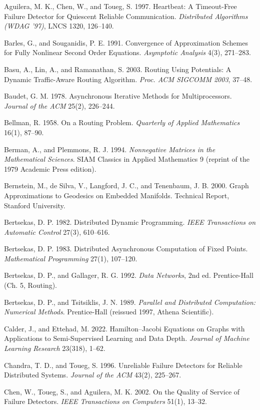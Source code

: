 \documentclass[11pt]{article}
\theoremstyle{plain}
\numberwithin{equation}{section}
\begin{document}
Aguilera, M. K., Chen, W., and Toueg, S. 1997. Heartbeat: A Timeout-Free Failure Detector for Quiescent Reliable Communication. \emph{Distributed Algorithms (WDAG '97)}, LNCS 1320, 126–140.

Barles, G., and Souganidis, P. E. 1991. Convergence of Approximation Schemes for Fully Nonlinear Second Order Equations. \emph{Asymptotic Analysis} 4(3), 271–283.

Basu, A., Lin, A., and Ramanathan, S. 2003. Routing Using Potentials: A Dynamic Traffic-Aware Routing Algorithm. \emph{Proc. ACM SIGCOMM 2003}, 37–48.

Baudet, G. M. 1978. Asynchronous Iterative Methods for Multiprocessors. \emph{Journal of the ACM} 25(2), 226–244.

Bellman, R. 1958. On a Routing Problem. \emph{Quarterly of Applied Mathematics} 16(1), 87–90.

Berman, A., and Plemmons, R. J. 1994. \emph{Nonnegative Matrices in the Mathematical Sciences}. SIAM Classics in Applied Mathematics 9 (reprint of the 1979 Academic Press edition).

Bernstein, M., de Silva, V., Langford, J. C., and Tenenbaum, J. B. 2000. Graph Approximations to Geodesics on Embedded Manifolds. Technical Report, Stanford University.

Bertsekas, D. P. 1982. Distributed Dynamic Programming. \emph{IEEE Transactions on Automatic Control} 27(3), 610–616.

Bertsekas, D. P. 1983. Distributed Asynchronous Computation of Fixed Points. \emph{Mathematical Programming} 27(1), 107–120.

Bertsekas, D. P., and Gallager, R. G. 1992. \emph{Data Networks}, 2nd ed. Prentice-Hall (Ch. 5, Routing).

Bertsekas, D. P., and Tsitsiklis, J. N. 1989. \emph{Parallel and Distributed Computation: Numerical Methods}. Prentice-Hall (reissued 1997, Athena Scientific).

Calder, J., and Ettehad, M. 2022. Hamilton–Jacobi Equations on Graphs with Applications to Semi-Supervised Learning and Data Depth. \emph{Journal of Machine Learning Research} 23(318), 1–62.

Chandra, T. D., and Toueg, S. 1996. Unreliable Failure Detectors for Reliable Distributed Systems. \emph{Journal of the ACM} 43(2), 225–267.

Chen, W., Toueg, S., and Aguilera, M. K. 2002. On the Quality of Service of Failure Detectors. \emph{IEEE Transactions on Computers} 51(1), 13–32.
\end{document}
